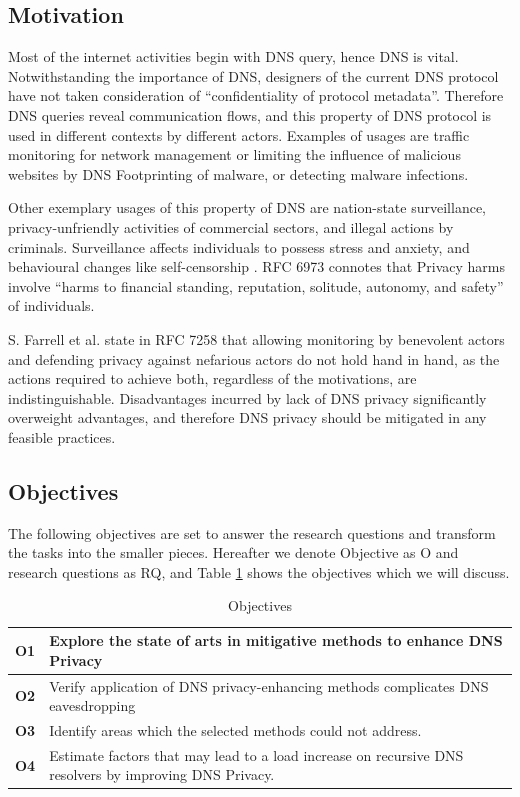 \documentclass[a4paper,12pt]{article}
\begin{document}
\subsection{Motivation}
Most of the internet activities begin with DNS query, hence DNS is vital. Notwithstanding the importance of DNS, designers of the current DNS protocol have not taken consideration of ``confidentiality of protocol metadata''. Therefore DNS queries reveal communication flows, and this property of DNS protocol is used in different contexts by different actors. Examples of usages are traffic monitoring for network management or limiting the influence of malicious websites by DNS Footprinting of malware\cite{stoner2010dns}, or detecting malware infections\cite{lemos2013got}.

Other exemplary usages of this property of DNS are nation-state surveillance, privacy-unfriendly activities of commercial sectors\cite{weaver2011redirecting}, and illegal actions by criminals. Surveillance affects individuals to possess stress and anxiety\cite{oulasvirta2012long}, and behavioural changes like self-censorship \cite{rfc6973}. RFC 6973 connotes that Privacy harms involve ``harms to financial standing, reputation, solitude, autonomy, and safety\cite{rfc6973}'' of individuals.

S. Farrell et al. state in RFC 7258 that allowing monitoring by benevolent actors and defending privacy against nefarious actors do not hold hand in hand, as the actions required to achieve both, regardless of the motivations, are indistinguishable\cite{rfc7258}.
Disadvantages incurred by lack of DNS privacy significantly overweight advantages, and therefore DNS privacy should be mitigated in any feasible practices.

\subsection{Objectives}
The following objectives are set to answer the research questions and transform the tasks into the smaller pieces. Hereafter we denote Objective as O and research questions as RQ, and Table \ref{objectives} shows the objectives which we will discuss.
\begin{table}[h!]
    \begin{tabular} {|p{1.2cm}|p{12.8cm}|} \hline
        \textbf{O1} & Explore the state of arts in mitigative methods to enhance DNS Privacy \\ \hline
        \textbf{O2} & Verify application of DNS privacy-enhancing methods complicates DNS eavesdropping\\ \hline
        \textbf{O3} & Identify areas which the selected methods could not address. \\ \hline
        \textbf{O4} & Estimate factors that may lead to a load increase on recursive DNS resolvers by improving DNS Privacy.\\ \hline
    \end{tabular}
    \caption{Objectives}
    \label{objectives}
\end{table}
\end{document}
